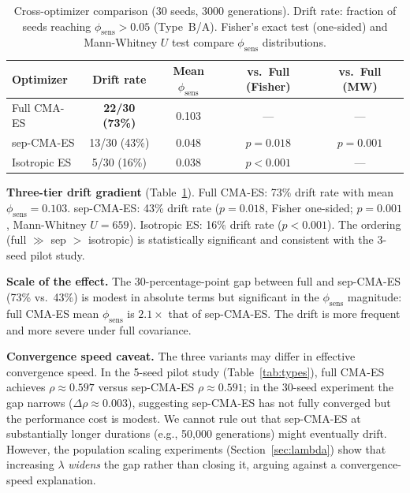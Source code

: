 \documentclass[twoside]{article}
\begin{document}
\begin{table}[t]
\caption{Cross-optimizer comparison (30 seeds, 3000 generations).
Drift rate: fraction of seeds reaching $\phi_{\text{sens}} > 0.05$ (Type~B/A).
Fisher's exact test (one-sided) and Mann-Whitney $U$ test compare
$\phi_{\text{sens}}$ distributions.}
\label{tab:crossopt}
\centering
\begin{tabular}{lcccc}
\toprule
Optimizer & Drift rate & Mean $\phi_{\text{sens}}$ & vs.\ Full (Fisher) & vs.\ Full (MW) \\
\midrule
Full CMA-ES & \textbf{22/30 (73\%)} & 0.103 & --- & --- \\
sep-CMA-ES & 13/30 (43\%) & 0.048 & $p = 0.018$ & $p = 0.001$ \\
Isotropic ES & 5/30 (16\%) & 0.038 & $p < 0.001$ & --- \\
\bottomrule
\end{tabular}
\end{table}

\textbf{Three-tier drift gradient} (Table~\ref{tab:crossopt}).
Full CMA-ES: 73\% drift rate with mean $\phi_{\text{sens}} = 0.103$.
sep-CMA-ES: 43\% drift rate ($p = 0.018$, Fisher one-sided; $p = 0.001$,
Mann-Whitney $U = 659$). Isotropic ES: 16\% drift rate ($p < 0.001$).
The ordering (full $\gg$ sep $>$ isotropic) is statistically
significant and consistent with the 3-seed pilot study.

\textbf{Scale of the effect.} The 30-percentage-point gap between full and
sep-CMA-ES (73\% vs.\ 43\%) is modest in absolute terms but significant
in the $\phi_{\text{sens}}$ magnitude: full CMA-ES mean $\phi_{\text{sens}}$
is $2.1\times$ that of sep-CMA-ES. The drift is more frequent and more severe under full covariance.

\textbf{Convergence speed caveat.} The three variants may differ in effective
convergence speed. In the 5-seed pilot study (Table~\ref{tab:types}),
full CMA-ES achieves $\rho \approx 0.597$ versus sep-CMA-ES
$\rho \approx 0.591$; in the 30-seed experiment the gap narrows
($\Delta\rho \approx 0.003$), suggesting sep-CMA-ES has not fully
converged but the performance cost is modest. We cannot
rule out that sep-CMA-ES at substantially longer durations (e.g., 50{,}000
generations) might eventually drift. However, the population scaling experiments
(Section~\ref{sec:lambda}) show that increasing $\lambda$ \emph{widens} the
gap rather than closing it, arguing against a convergence-speed explanation.

\end{document}

